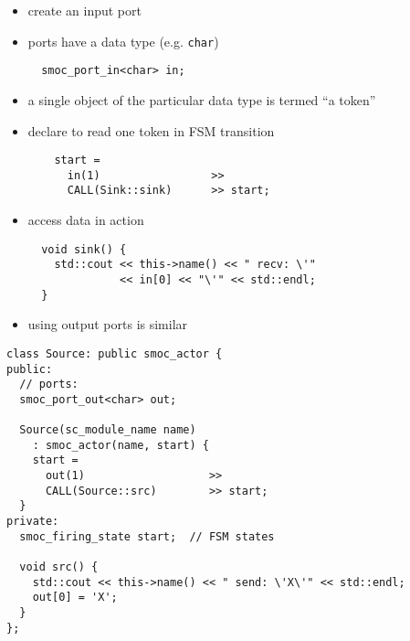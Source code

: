 \begin{frame}[fragile=singleslide]
\begin{itemize}
\item create an input port
\item ports have a data type (e.g. \lstinline!char!)
\begin{lstlisting}
  smoc_port_in<char> in;
\end{lstlisting}
\item a single object of the particular data type is termed ``a token''
\item declare to read one token in FSM transition
\begin{lstlisting}
    start =
      in(1)                 >>
      CALL(Sink::sink)      >> start;
\end{lstlisting}
\item access data in action
\begin{lstlisting}
  void sink() {
    std::cout << this->name() << " recv: \'"
              << in[0] << "\'" << std::endl;
  }
\end{lstlisting}
\end{itemize}
\end{frame}




\begin{frame}[fragile=singleslide]
\begin{itemize}
\item using output ports is similar
\end{itemize}
\begin{lstlisting}
class Source: public smoc_actor {
public:
  // ports:
  smoc_port_out<char> out;

  Source(sc_module_name name)
    : smoc_actor(name, start) {
    start = 
      out(1)                   >>
      CALL(Source::src)        >> start;
  }
private:
  smoc_firing_state start;  // FSM states

  void src() {
    std::cout << this->name() << " send: \'X\'" << std::endl;
    out[0] = 'X';
  }
};
\end{lstlisting}
\end{frame}






